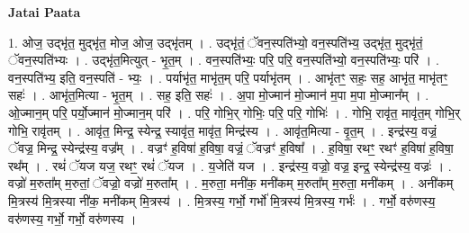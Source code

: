 \documentclass[17pt]{extarticle}
\begin{document}
\textbf{Jatai Paata} \newline

1. ओज॒ उद्‍भृ॑त॒ मुद्‍भृ॑त॒ मोज॒ ओज॒ उद्‍भृ॑तम् । . उद्‍भृ॑तं॒ ॅवन॒स्पति॑भ्यो॒ वन॒स्पति॑भ्य॒ उद्‍भृ॑त॒ मुद्‍भृ॑तं॒ ॅवन॒स्पति॑भ्यः । . उद्‍भृ॑त॒मित्युत् - भृ॒त॒म् । . वन॒स्पति॑भ्यः॒ परि॒ परि॒ वन॒स्पति॑भ्यो॒ वन॒स्पति॑भ्यः॒ परि॑ । . वन॒स्पति॑भ्य॒ इति॒ वन॒स्पति॑ - भ्यः॒ । . पर्याभृ॑त॒ माभृ॑त॒म् परि॒ पर्याभृ॑तम् । . आभृ॑तꣳ॒॒ सहः॒ सह॒ आभृ॑त॒ माभृ॑तꣳ॒॒ सहः॑ । . आभृ॑त॒मित्या - भृ॒त॒म् । . सह॒ इति॒ सहः॑ । . अ॒पा मो॒ज्मान॑ मो॒ज्मान॑ म॒पा म॒पा मो॒ज्मान᳚म् । . ओ॒ज्मान॒म् परि॒ पर्यो॒ज्मान॑ मो॒ज्मान॒म् परि॑ । . परि॒ गोभि॒र् गोभिः॒ परि॒ परि॒ गोभिः॑ । . गोभि॒ रावृ॑त॒ मावृ॑त॒म् गोभि॒र् गोभि॒ रावृ॑तम् । . आवृ॑त॒ मिन्द्र॒ स्येन्द्र॒ स्यावृ॑त॒ मावृ॑त॒ मिन्द्र॑स्य । . आवृ॑त॒मित्या - वृ॒त॒म् । . इन्द्र॑स्य॒ वज्रं॒ ॅवज्र॒ मिन्द्र॒ स्येन्द्र॑स्य॒ वज्र᳚म् । . वज्रꣳ॑ ह॒विषा॑ ह॒विषा॒ वज्रं॒ ॅवज्रꣳ॑ ह॒विषा᳚ । . ह॒विषा॒ रथꣳ॒॒ रथꣳ॑ ह॒विषा॑ ह॒विषा॒ रथ᳚म् । . रथं॑ ॅयज यज॒ रथꣳ॒॒ रथं॑ ॅयज । . य॒जेति॑ यज । . इन्द्र॑स्य॒ वज्रो॒ वज्र॒ इन्द्र॒ स्येन्द्र॑स्य॒ वज्रः॑ । . वज्रो॑ म॒रुता᳚म् म॒रुतां॒ ॅवज्रो॒ वज्रो॑ म॒रुता᳚म् । . म॒रुता॒ मनी॑क॒ मनी॑कम् म॒रुता᳚म् म॒रुता॒ मनी॑कम् । . अनी॑कम् मि॒त्रस्य॑ मि॒त्रस्या नी॑क॒ मनी॑कम् मि॒त्रस्य॑ । . मि॒त्रस्य॒ गर्भो॒ गर्भो॑ मि॒त्रस्य॑ मि॒त्रस्य॒ गर्भः॑ । . गर्भो॒ वरु॑णस्य॒ वरु॑णस्य॒ गर्भो॒ गर्भो॒ वरु॑णस्य । \newline
\end{document}
